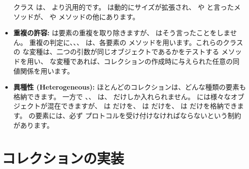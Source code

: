 \documentclass[a4paper,10pt,twoside]{book}
\begin{document}
\begin{itemize}
         クラス は、 より汎用的です。 は動的にサイズが拡張され、 や  と言ったメソッドが、 や  メソッドの他にあります。
  
  \item {\bf 重複の許容:}
  	 は要素の重複を取り除きますが、 はそう言ったことをしません。
	重複の判定に、、、 は、各要素の \ct{=} メソッドを用います。これらのクラスの  な変種は、二つの引数が同じオブジェクトであるかをテストする \ct{==} メソッドを用い、 な変種であれば、コレクションの作成時に与えられた任意の同値関係を用います。

  \item {\bf 異種性 (Heterogeneous):}
        ほとんどのコレクションは、どんな種類の要素も格納できます。
        一方で 、、 は、 だけしか入れられません。
         には様々なオブジェクトが混在できますが、 は  だけを、 は  だけを、 は  だけを格納できます。
	 の要素には、必ず  プロトコルを受け付けなければならないという制約があります。

\end{itemize}


\section{コレクションの実装}
\end{document}
